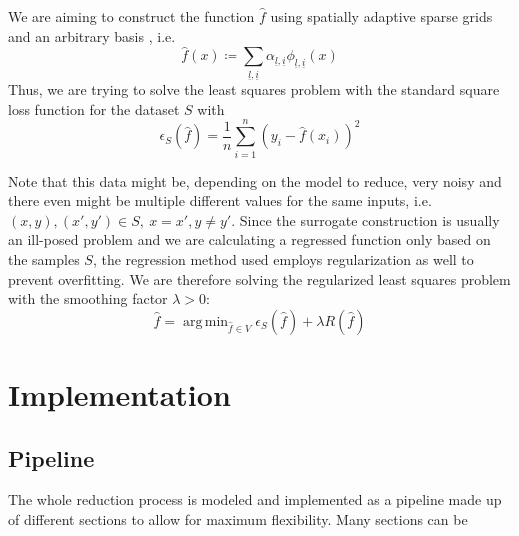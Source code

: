 \documentclass[
  a4paper,  %
  twoside,  %
  bibliography=totoc,
  headsepline,
  cleardoublepage=empty,
  parskip=half,
  draft=false
]{scrbook}
\DeclareMathOperator*{\argmin}{arg\,min}
\begin{document}
We are aiming to construct the function $\hat{f}$ using spatially adaptive sparse grids and an arbitrary basis , i.e.
\begin{equation}
\hat{f}(x) \coloneqq \sum_{\underline{l},\underline{i}} \alpha_{\underline{l},\underline{i}} \phi_{\underline{l},\underline{i}}(x)
\end{equation}
Thus, we are trying to solve the least squares problem with the standard square loss function for the dataset $S$ with
\begin{equation}
\epsilon_{S}(\hat{f})=\frac{1}{n} \sum_{i=1}^n (y_i - \hat{f}(x_i))^2 
\end{equation}

Note that this data might be, depending on the model to reduce, very noisy and there even might be multiple different values for the same inputs, i.e. $(x,y), (x',y') \in S, ~ x=x', y\neq y'$.
Since the surrogate construction is usually an ill-posed problem and we are calculating a regressed function only based on the samples $S$, the regression method used employs regularization as well to prevent overfitting.
We are therefore solving the regularized least squares problem with the smoothing factor $\lambda > 0$:
\begin{equation}
\hat{f} = \argmin_{\hat{f} \in V} \epsilon_{S}(\hat{f}) + \lambda R(\hat{f})
\end{equation}

\chapter{Implementation}


\section{Pipeline}

The whole reduction process is modeled and implemented as a pipeline made up of different sections to allow for maximum flexibility.
Many sections can be
\end{document}
